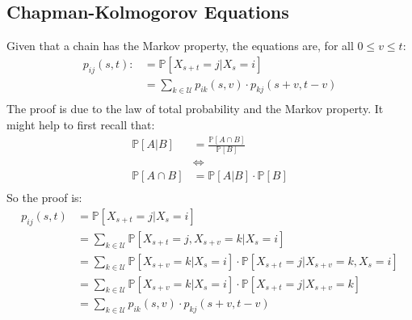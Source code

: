 \documentclass[12pt]{report}
\begin{document}
\subsection{Chapman-Kolmogorov Equations}
Given that a chain has the Markov property, the equations are, for all $0 \le v
\le t$:
\begin{equation*}
    \begin{aligned}
        p_{ij}(s, t) :&= \mathbb{P}\left[X_{s+t} = j | X_{s} = i\right] \\
                     &= \sum_{k\in\mathcal{U}} p_{ik}(s,v) \cdot p_{kj}(s+v,t-v)\\
    \end{aligned}
\end{equation*}
The proof is due to the law of total probability and the Markov property. It
might help to first recall that:
\begin{equation*}
    \begin{aligned}
        \mathbb{P}\left[A | B\right] &= \frac{ \mathbb{P}\left[A \cap B\right]}{ \mathbb{P}\left[B\right] } \\
            &\iff \\
        \mathbb{P}\left[A \cap B \right]  &=  \mathbb{P}\left[A | B\right] \cdot \mathbb{P}\left[B\right] \\
    \end{aligned}
\end{equation*}
So the proof is:
\begin{equation*}
    \begin{aligned}
        p_{ij}(s, t) &= \mathbb{P}\left[X_{s+t} = j | X_{s} = i\right] \\
            &= \sum_{k\in\mathcal{U}} \mathbb{P}\left[X_{s+t} = j, X_{s+v} = k | X_{s} = i\right]  \\
            &= \sum_{k\in\mathcal{U}} \mathbb{P}\left[ X_{s+v} = k | X_{s} = i \right] \cdot \mathbb{P}\left[ X_{s+t} = j | X_{s+v} = k, X_{s} = i\right]  \\
            &= \sum_{k\in\mathcal{U}} \mathbb{P}\left[ X_{s+v} = k | X_{s} = i \right] \cdot \mathbb{P}\left[ X_{s+t} = j | X_{s+v} = k\right]  \\
            &= \sum_{k\in\mathcal{U}} p_{ik}(s,v) \cdot p_{kj}(s+v,t-v)\\
    \end{aligned}
\end{equation*}
\end{document}
